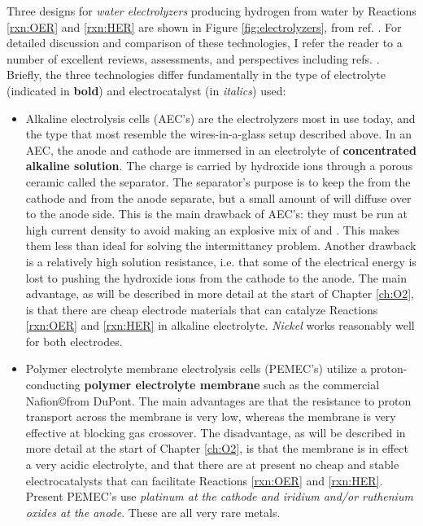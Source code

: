 Three designs for \textit{water electrolyzers} producing hydrogen from water by Reactions \ref{rxn:OER} and \ref{rxn:HER} are shown in Figure \ref{fig:electrolyzers}, from ref. . For detailed discussion and comparison of these technologies, I refer the reader to a number of excellent reviews, assessments, and perspectives including refs. . Briefly, the three technologies differ fundamentally in the type of electrolyte (indicated in \textbf{bold}) and electrocatalyst (in \textit{italics}) used: 

\begin{itemize}
\item Alkaline electrolysis cells (AEC's) are the electrolyzers most in use today, and the type that most resemble the wires-in-a-glass setup described above. In an AEC, the anode and cathode are immersed in an electrolyte of \textbf{concentrated alkaline solution}. The charge is carried by hydroxide ions through a porous ceramic called the separator. The separator's purpose is to keep the  from the cathode and  from the anode separate, but a small amount of  will diffuse over to the anode side. This is the main drawback of AEC's: they must be run at high current density to avoid making an explosive mix of  and . This makes them less than ideal for solving the intermittancy problem. Another drawback is a relatively high solution resistance, i.e. that some of the electrical energy is lost to pushing the hydroxide ions from the cathode to the anode. The main advantage, as will be described in more detail at the start of Chapter \ref{ch:O2}, is that there are cheap electrode materials that can catalyze Reactions \ref{rxn:OER} and \ref{rxn:HER} in alkaline electrolyte. \textit{Nickel} works reasonably well for both electrodes.

\item Polymer electrolyte membrane electrolysis cells (PEMEC's) utilize a proton-conducting \textbf{polymer electrolyte membrane} such as the commercial Nafion\copyright  from DuPont. The main advantages are that the resistance to proton transport across the membrane is very low, whereas the membrane is very effective at blocking gas crossover. The disadvantage, as will be described in more detail at the start of Chapter \ref{ch:O2}, is that the membrane is in effect a very acidic electrolyte, and that there are at present no cheap and stable electrocatalysts that can facilitate Reactions \ref{rxn:OER} and \ref{rxn:HER}. Present PEMEC's use \textit{platinum at the cathode and iridium and/or ruthenium oxides at the anode}. These are all very rare metals.


\end{itemize}

